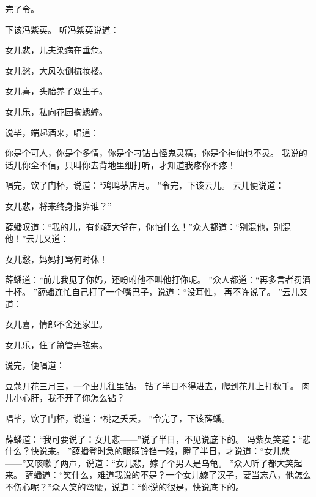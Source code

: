 完了令。
\par
下该冯紫英。
听冯紫英说道：\par
\hop
女儿悲，儿夫染病在垂危。
\par
女儿愁，大风吹倒梳妆楼。
\par
女儿喜，头胎养了双生子。
\par
女儿乐，私向花园掏蟋蟀。
\par
\hop
说毕，端起酒来，唱道：\par
\hop
你是个可人，你是个多情，你是个刁钻古怪鬼灵精，你是个神仙也不灵。
我说的话儿你全不信，只叫你去背地里细打听，才知道我疼你不疼！\par
\hop
唱完，饮了门杯，说道：“鸡鸣茅店月。
”令完，下该云儿。
云儿便说道：\par
\hop
女儿悲，将来终身指靠谁？” \par
\hop
薛蟠叹道：“我的儿，有你薛大爷在，你怕什么！”众人都道：“别混他，别混他！”云儿又道：\par
\hop
女儿愁，妈妈打骂何时休！\par
\hop
薛蟠道：“前儿我见了你妈，还吩咐他不叫他打你呢。
”众人都道：“再多言者罚酒十杯。
”薛蟠连忙自己打了一个嘴巴子，说道：“没耳性，
再不许说了。
”云儿又道：\par
\hop
女儿喜，情郎不舍还家里。
\par
女儿乐，住了箫管弄弦索。
\par
\hop
说完，便唱道：\par
\hop
豆蔻开花三月三，一个虫儿往里钻。
钻了半日不得进去，爬到花儿上打秋千。
肉儿小心肝，我不开了你怎么钻？\par
\hop
唱毕，饮了门杯，说道：“桃之夭夭。
”令完了，下该薛蟠。
\par
薛蟠道：“我可要说了：女儿悲——”说了半日，不见说底下的。
冯紫英笑道：“悲什么？快说来。
”薛蟠登时急的眼睛铃铛一般，瞪了半日，才说道：“女儿悲——”又咳嗽了两声，说道：“女儿悲，嫁了个男人是乌龟。
”众人听了都大笑起来。
薛蟠道：“笑什么，难道我说的不是？一个女儿嫁了汉子，要当忘八，他怎么不伤心呢？”众人笑的弯腰，说道：“你说的很是，快说底下的。
